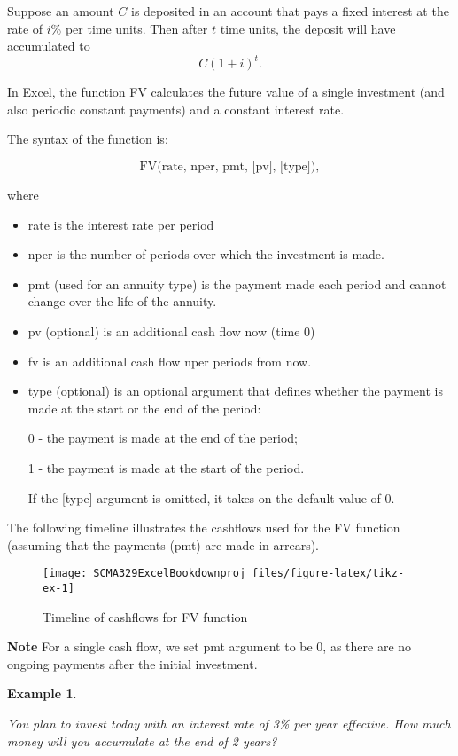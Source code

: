 \documentclass[
]{article}
\theoremstyle{definition}
\theoremstyle{definition}
\newtheorem{example}{Example}[section]
\theoremstyle{definition}
\theoremstyle{definition}
\theoremstyle{remark}
\begin{document}
Suppose an amount \(C\) is deposited in an account that pays a fixed
interest at the rate of \(i\)\% per time units. Then after \(t\) time units,
the deposit will have accumulated to \[C (1+i)^t.\]

In Excel, the function FV calculates the future value of a single
investment (and also periodic constant payments) and a constant interest
rate.

The syntax of the function is:

\[\text{FV(rate, nper, pmt, [pv], [type])},\]

where

\begin{itemize}
\item
  rate is the interest rate per period
\item
  nper is the number of periods over which the investment is made.
\item
  pmt (used for an annuity type) is the payment made each period and
  cannot change over the life of the annuity.
\item
  pv (optional) is an additional cash flow now (time 0)
\item
  fv is an additional cash flow nper periods from now.
\item
  type (optional) is an optional argument that defines whether the
  payment is made at the start or the end of the period:

  0 - the payment is made at the end of the period;

  1 - the payment is made at the start of the period.

  If the {[}type{]} argument is omitted, it takes on the default value
  of 0.
\end{itemize}

The following timeline illustrates the cashflows used for the FV
function (assuming that the payments (pmt) are made in arrears).

\begin{figure}

{\centering \texttt{[image: SCMA329ExcelBookdownproj\_files/figure-latex/tikz-ex-1]} 

}

\caption{Timeline of cashflows for FV function}\label{fig:tikz-ex}
\end{figure}

\textbf{Note} For a single cash flow, we set pmt argument to be 0, as there are no
ongoing payments after the initial investment.

\begin{example}
\protect\hypertarget{exm:unlabeled-div-3}{}\label{exm:unlabeled-div-3}

\emph{You plan to invest today with an interest rate of 3\% per
year effective. How much money will you accumulate at the end of 2
years?}

\end{example}
\end{document}
